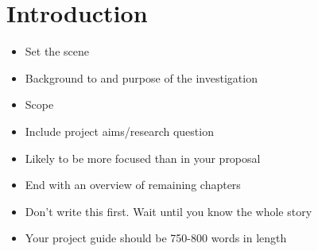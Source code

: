 \section{Introduction}
\begin{itemize}
\item Set the scene
\item Background to and purpose of the investigation
\item Scope
\item Include project aims/research question
\item Likely to be more focused than in your proposal
\item End with an overview of remaining chapters
\item Don't write this first. Wait until you know the whole story
\item Your project guide should be 750-800 words in length
\end{itemize}